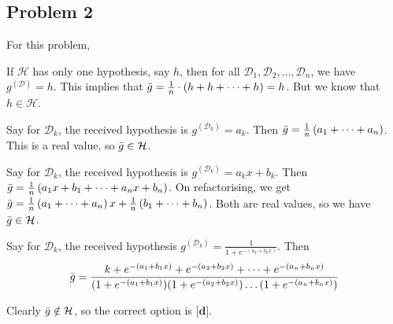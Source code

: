\documentclass{article}
\begin{document}
\subsection*{Problem 2}
For this problem,
\begin{enumerate}[label=\textbf{[\alph*]}]
    \item If $\mathcal{H}$ has only one hypothesis, say $h$, then for all $\mathcal{D}_{1}, \mathcal{D}_{2}, \dots, \mathcal{D}_{n}$, we have $g^{(\mathcal{D})} = h$. This implies that $\Bar{g} = \frac{1}{n}\cdot (h + h + \dots + h) = h$. But we know that $h \in \mathcal{H}$. 
    \item Say for $\mathcal{D}_{k}$, the received hypothesis is $g^{(\mathcal{D}_k)} = a_{k}$. Then $\Bar{g} = \frac{1}{n}\left(a_{1} + \dots + a_{n}\right)$. This is a real value, so $\Bar{g} \in \mathcal{H}$. 
    \item Say for $\mathcal{D}_{k}$, the received hypothesis is $g^{(\mathcal{D}_k)} = a_{k}x + b_{k}$. Then $\Bar{g} = \frac{1}{n}\left(a_{1}x + b_{1} + \dots + a_{n}x + b_{n}\right)$. On refactorising, we get $\Bar{g} = \frac{1}{n}\left(a_{1} + \dots + a_{n}\right)x + \frac{1}{n}\left(b_{1} + \dots + b_{n}\right)$. Both are real values, so we have $\Bar{g} \in \mathcal{H}$. 
    \item Say for $\mathcal{D}_{k}$, the received hypothesis $g^{(\mathcal{D}_{k})} = \frac{1}{1 + e^{-(a_{k} + b_{k}x)}}$. Then
    \begin{equation*}
        \Bar{g} = \frac{k + e^{-(a_{1} + b_{1}x) } + e^{-(a_{2} + b_2x)} + \dots + e^{-(a_{n} + b_n x)}}{(1 + e^{-(a_{1} + b_{1}x)})(1 + e^{-(a_{2} + b_{2}x)})\dots (1 + e^{-(a_{n} + b_{n}x)})}
    \end{equation*}
\end{enumerate}
Clearly $\Bar{g} \notin \mathcal{H}$, so the correct option is $\textbf{[d]}$. 
\newpage
\end{document}
